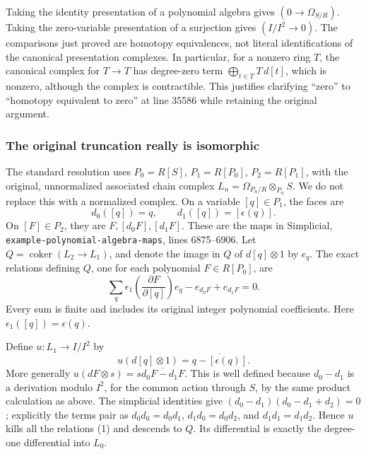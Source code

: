 Taking the identity presentation of a polynomial algebra gives \((0\to\Omega_{S/R})\). Taking the zero-variable presentation of a surjection gives \((I/I^2\to0)\). The comparisons just proved are homotopy equivalences, not literal identifications of the canonical presentation complexes. In particular, for a nonzero ring \(T\), the canonical complex for \(T\to T\) has degree-zero term \(\bigoplus_{t\in T}T\,d[t]\), which is nonzero, although the complex is contractible. This justifies clarifying ``zero'' to ``homotopy equivalent to zero'' at line 35586 while retaining the original argument.

\subsubsection{The original truncation really is isomorphic}\label{algebra-proof-044-the-original-truncation-really-is-isomorphic}

The standard resolution uses \(P_0=R[S]\), \(P_1=R[P_0]\), \(P_2=R[P_1]\), with the original, unnormalized associated chain complex \(L_n=\Omega_{P_n/R}\otimes_{P_n}S\). We do not replace this with a normalized complex. On a variable \([q]\in P_1\), the faces are \[
d_0([q])=q,\qquad d_1([q])=[\epsilon(q)].
\] On \([F]\in P_2\), they are \(F,[d_0F],[d_1F]\). These are the maps in Simplicial, \texttt{example-\AlgebraIdentifierBreak{}polynomial-\AlgebraIdentifierBreak{}algebra-\AlgebraIdentifierBreak{}maps}, lines 6875--6906. Let \(Q=\operatorname{coker}(L_2\to L_1)\), and denote the image in \(Q\) of \(d[q]\otimes1\) by \(e_q\). The exact relations defining \(Q\), one for each polynomial \(F\in R[P_0]\), are \[
\sum_q \epsilon_1\!\left(\frac{\partial F}{\partial[q]}\right)e_q
-e_{d_0F}+e_{d_1F}=0.\tag{1}
\] Every sum is finite and includes its original integer polynomial coefficients. Here \(\epsilon_1([q])=\epsilon(q)\).

Define \(u:L_1\to I/I^2\) by \[
u(d[q]\otimes1)=\overline{q-[\epsilon(q)]}.
\] More generally \(u(dF\otimes s)=s\overline{d_0F-d_1F}\). This is well defined because \(d_0-d_1\) is a derivation modulo \(I^2\), for the common action through \(S\), by the same product calculation as above. The simplicial identities give \((d_0-d_1)(d_0-d_1+d_2)=0\); explicitly the terms pair as \(d_0d_0=d_0d_1\), \(d_1d_0=d_0d_2\), and \(d_1d_1=d_1d_2\). Hence \(u\) kills all the relations (1) and descends to \(Q\). Its differential is exactly the degree-one differential into \(L_0\).


